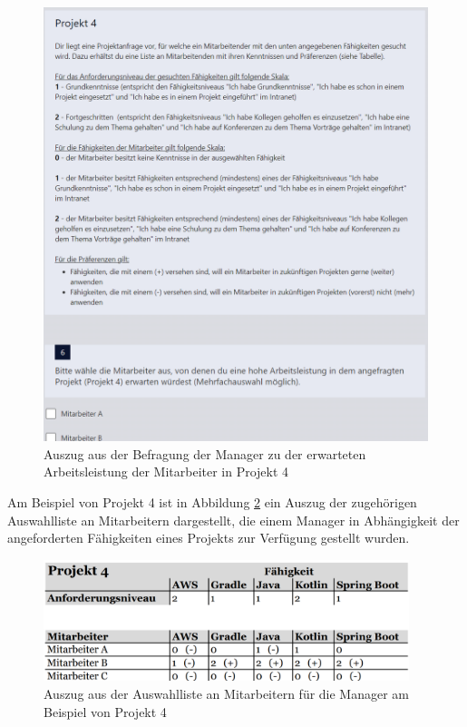 \begin{figure}[H]
    \centering
	\includegraphics[width=1\textwidth]{gfx/befragung-arbeitsleistung.png}
	\caption[Auszug aus der Befragung der Manager zu der erwarteten Arbeitsleistung der Mitarbeiter in Projekt 4]{Auszug aus der Befragung der Manager zu der erwarteten Arbeitsleistung der Mitarbeiter in Projekt 4}
	\label{fig:methodik:abb6}
\end{figure}

Am Beispiel von Projekt 4 ist in Abbildung \ref{fig:methodik:abb7} ein Auszug der zugehörigen Auswahlliste an Mitarbeitern dargestellt, die einem Manager in Abhängigkeit der angeforderten Fähigkeiten eines Projekts zur Verfügung gestellt wurden.

\begin{figure}[H]
    \centering
	\includegraphics[width=0.95\textwidth]{gfx/befragung-arbeitsleistung-liste-ma.png}
	\caption[Auszug aus der Auswahlliste an Mitarbeitern für die Manager am Beispiel von Projekt 4]{Auszug aus der Auswahlliste an Mitarbeitern für die Manager am Beispiel von Projekt 4}
	\label{fig:methodik:abb7}
\end{figure}

